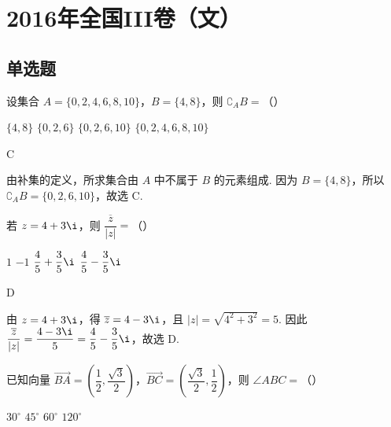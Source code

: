 

\chapter{2016年全国III卷（文）}

\section{单选题}

\begin{problem}
设集合 \(A=\{0,2,4,6,8,10\}\)，\(B=\{4,8\}\)，则 \(\complement_A B=\)（\quad）

\choices
    {\(\{4,8\}\)}
    {\(\{0,2,6\}\)}
    {\(\{0,2,6,10\}\)}
    {\(\{0,2,4,6,8,10\}\)}
\end{problem}

\begin{answer}
C
\end{answer}

\begin{solution}
由补集的定义，所求集合由 \(A\) 中不属于 \(B\) 的元素组成. 因为 \(B=\{4,8\}\)，所以 \(\complement_A B=\{0,2,6,10\}\)，故选 C.
\end{solution}

\begin{problem}
若 \(z=4+3\i\)，则 \(\dfrac{\overline z}{|z|}=\)（\quad）

\choices
    {\(1\)}
    {\(-1\)}
    {\(\dfrac45+\dfrac35\i\)}
    {\(\dfrac45-\dfrac35\i\)}
\end{problem}

\begin{answer}
D
\end{answer}

\begin{solution}
由 \(z=4+3\i\)，得 \(\overline z=4-3\i\)，且 \(|z|=\sqrt{4^2+3^2}=5\). 因此 \(\dfrac{\overline z}{|z|}=\dfrac{4-3\i}{5}=\dfrac45-\dfrac35\i\)，故选 D.
\end{solution}

\begin{problem}
已知向量 \(\overrightarrow{BA}=\left( \dfrac12,\dfrac{\sqrt3}{2} \right)\)，\(\overrightarrow{BC}=\left( \dfrac{\sqrt3}{2},\dfrac12 \right)\)，则 \(\angle ABC=\)（\quad）

\choices
    {\(30^\circ\)}
    {\(45^\circ\)}
    {\(60^\circ\)}
    {\(120^\circ\)}
\end{problem}

